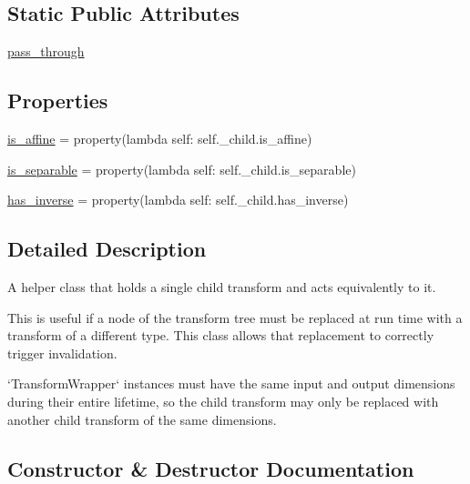 \subsection*{Static Public Attributes}
\begin{DoxyCompactItemize}
\item 
\hyperlink{classmatplotlib_1_1transforms_1_1TransformWrapper_a8150a6ac727470d6fe735685792290d8}{pass\+\_\+through}
\end{DoxyCompactItemize}
\subsection*{Properties}
\begin{DoxyCompactItemize}
\item 
\hyperlink{classmatplotlib_1_1transforms_1_1TransformWrapper_a9ca115930bbc38b1a17e322ea005f428}{is\+\_\+affine} = property(lambda self\+: self.\+\_\+child.\+is\+\_\+affine)
\item 
\hyperlink{classmatplotlib_1_1transforms_1_1TransformWrapper_a70e7a6a89879866c3b526d3a54e44f32}{is\+\_\+separable} = property(lambda self\+: self.\+\_\+child.\+is\+\_\+separable)
\item 
\hyperlink{classmatplotlib_1_1transforms_1_1TransformWrapper_a55a64cd8c3c4330fda3fe863ad17d3c2}{has\+\_\+inverse} = property(lambda self\+: self.\+\_\+child.\+has\+\_\+inverse)
\end{DoxyCompactItemize}


\subsection{Detailed Description}
\begin{DoxyVerb}A helper class that holds a single child transform and acts
equivalently to it.

This is useful if a node of the transform tree must be replaced at
run time with a transform of a different type.  This class allows
that replacement to correctly trigger invalidation.

`TransformWrapper` instances must have the same input and output dimensions
during their entire lifetime, so the child transform may only be replaced
with another child transform of the same dimensions.
\end{DoxyVerb}
 

\subsection{Constructor \& Destructor Documentation}
\mbox{\label{classmatplotlib_1_1transforms_1_1TransformWrapper_a19c4902a2a5a4721e5068c3380cf17d7}} 
